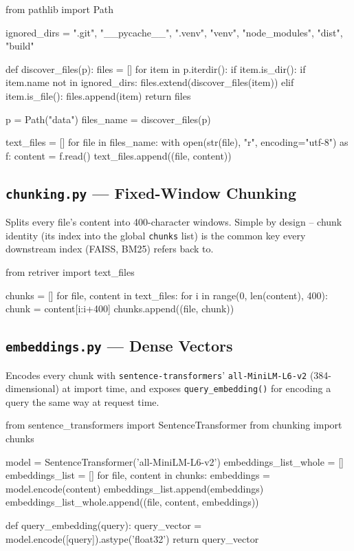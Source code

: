 \documentclass[11pt,a4paper]{article}
\begin{document}
\begin{pycode}[retriver.py]
from pathlib import Path

ignored_dirs = {
    ".git", "__pycache__", ".venv", "venv",
    "node_modules", "dist", "build"
}

def discover_files(p):
    files = []
    for item in p.iterdir():
        if item.is_dir():
            if item.name not in ignored_dirs:
                files.extend(discover_files(item))
        elif item.is_file():
            files.append(item)
    return files

p = Path("data")
files_name = discover_files(p)

text_files = []
for file in files_name:
    with open(str(file), "r", encoding="utf-8") as f:
        content = f.read()
        text_files.append((file, content))
\end{pycode}

\subsection{\texttt{chunking.py} --- Fixed-Window Chunking}

Splits every file's content into 400-character windows. Simple by design --
chunk identity (its index into the global \texttt{chunks} list) is the
common key every downstream index (FAISS, BM25) refers back to.

\begin{pycode}[chunking.py]
from retriver import text_files

chunks = []
for file, content in text_files:
    for i in range(0, len(content), 400):
        chunk = content[i:i+400]
        chunks.append((file, chunk))
\end{pycode}

\subsection{\texttt{embeddings.py} --- Dense Vectors}

Encodes every chunk with \texttt{sentence-transformers}' \texttt{all-MiniLM-L6-v2}
(384-dimensional) at import time, and exposes \texttt{query\_embedding()} for
encoding a query the same way at request time.

\begin{pycode}[embeddings.py]
from sentence_transformers import SentenceTransformer
from chunking import chunks

model = SentenceTransformer('all-MiniLM-L6-v2')
embeddings_list_whole = []
embeddings_list = []
for file, content in chunks:
    embeddings = model.encode(content)
    embeddings_list.append(embeddings)
    embeddings_list_whole.append((file, content, embeddings))

def query_embedding(query):
    query_vector = model.encode([query]).astype('float32')
    return query_vector
\end{pycode}
\end{document}
